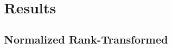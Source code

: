\documentclass[handout]{beamer}
\begin{document}
	
	\section{Results}
	
	\subsection{Normalized Rank-Transformed}
	
\end{document}
